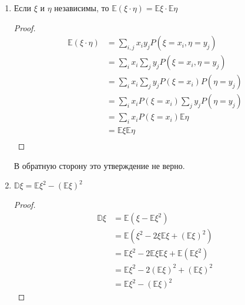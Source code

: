 \begin{prop}
\begin{enumerate}
\begin{proof}
              \end{proof}

              \begin{definition}
                  Дискретные случайные величины \(\xi\) и \(\eta\) \textbf{независимы}, если \(P(\xi = x_i, \eta = y_j) = P(\xi = x_i)P(\eta = y_j) \ \ \forall i,j\), т.е. случайные величины принимают свои значения независимо друг от друга.
              \end{definition}

        \item Если \(\xi\) и \(\eta\) независимы, то \(\mathbb{E}(\xi\cdot\eta) = \mathbb{E}\xi\cdot\mathbb{E}\eta\)
              \begin{proof}
                  \begin{align*}
                      \mathbb{E}(\xi\cdot\eta) & = \sum_{i, j} x_i y_j P(\xi = x_i, \eta = y_j)     \\
                                               & = \sum_i x_i \sum_j y_j P(\xi = x_i, \eta = y_j)   \\
                                               & = \sum_i x_i \sum_j y_j P(\xi = x_i) P(\eta = y_j) \\
                                               & = \sum_i x_i P(\xi = x_i) \sum_j y_j P(\eta = y_j) \\
                                               & = \sum_i x_i P(\xi = x_i) \mathbb{E}\eta           \\
                                               & = \mathbb{E}\xi \mathbb{E}\eta                     \\
                  \end{align*}
              \end{proof}

              В обратную сторону это утверждение не верно.

        \item \(\mathbb{D}\xi = \mathbb{E}\xi^2 - (\mathbb{E}\xi)^2\)
              \begin{proof}
                  \begin{align*}
                      \mathbb{D}\xi & = \mathbb{E}(\xi - \mathbb{E}\xi^2)                                             \\
                                    & = \mathbb{E}(\xi^2 - 2\xi\mathbb{E}\xi + (\mathbb{E}\xi)^2)                     \\
                                    & = \mathbb{E}\xi^2 - 2 \mathbb{E}\xi \mathbb{E}\xi + \mathbb{E}(\mathbb{E}\xi^2) \\
                                    & = \mathbb{E}\xi^2 - 2(\mathbb{E}\xi)^2 + (\mathbb{E}\xi)^2                      \\
                                    & = \mathbb{E}\xi^2 - (\mathbb{E}\xi)^2
                  \end{align*}
              \end{proof}


\end{enumerate}
\end{prop}
